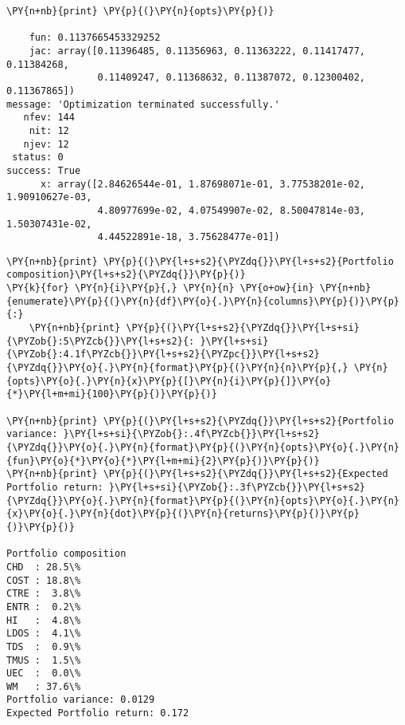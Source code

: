 \begin{Answer}
\begin{tcolorbox}[size=fbox, boxrule=1pt, colback=cellbackground, colframe=cellborder]
\begin{Verbatim}[commandchars=\\\{\}]
\PY{n+nb}{print} \PY{p}{(}\PY{n}{opts}\PY{p}{)}

    fun: 0.1137665453329252
    jac: array([0.11396485, 0.11356963, 0.11363222, 0.11417477, 0.11384268,
                0.11409247, 0.11368632, 0.11387072, 0.12300402, 0.11367865])
message: 'Optimization terminated successfully.'
   nfev: 144
    nit: 12
   njev: 12
 status: 0
success: True
      x: array([2.84626544e-01, 1.87698071e-01, 3.77538201e-02, 1.90910627e-03,
                4.80977699e-02, 4.07549907e-02, 8.50047814e-03, 1.50307431e-02,
                4.44522891e-18, 3.75628477e-01])
\end{Verbatim}
\end{tcolorbox}

\begin{tcolorbox}[size=fbox, boxrule=1pt, colback=cellbackground, colframe=cellborder]
\begin{Verbatim}[commandchars=\\\{\}]
\PY{n+nb}{print} \PY{p}{(}\PY{l+s+s2}{\PYZdq{}}\PY{l+s+s2}{Portfolio composition}\PY{l+s+s2}{\PYZdq{}}\PY{p}{)}
\PY{k}{for} \PY{n}{i}\PY{p}{,} \PY{n}{n} \PY{o+ow}{in} \PY{n+nb}{enumerate}\PY{p}{(}\PY{n}{df}\PY{o}{.}\PY{n}{columns}\PY{p}{)}\PY{p}{:}
    \PY{n+nb}{print} \PY{p}{(}\PY{l+s+s2}{\PYZdq{}}\PY{l+s+si}{\PYZob{}:5\PYZcb{}}\PY{l+s+s2}{: }\PY{l+s+si}{\PYZob{}:4.1f\PYZcb{}}\PY{l+s+s2}{\PYZpc{}}\PY{l+s+s2}{\PYZdq{}}\PY{o}{.}\PY{n}{format}\PY{p}{(}\PY{n}{n}\PY{p}{,} \PY{n}{opts}\PY{o}{.}\PY{n}{x}\PY{p}{[}\PY{n}{i}\PY{p}{]}\PY{o}{*}\PY{l+m+mi}{100}\PY{p}{)}\PY{p}{)}
		
\PY{n+nb}{print} \PY{p}{(}\PY{l+s+s2}{\PYZdq{}}\PY{l+s+s2}{Portfolio variance: }\PY{l+s+si}{\PYZob{}:.4f\PYZcb{}}\PY{l+s+s2}{\PYZdq{}}\PY{o}{.}\PY{n}{format}\PY{p}{(}\PY{n}{opts}\PY{o}{.}\PY{n}{fun}\PY{o}{*}\PY{o}{*}\PY{l+m+mi}{2}\PY{p}{)}\PY{p}{)}
\PY{n+nb}{print} \PY{p}{(}\PY{l+s+s2}{\PYZdq{}}\PY{l+s+s2}{Expected Portfolio return: }\PY{l+s+si}{\PYZob{}:.3f\PYZcb{}}\PY{l+s+s2}{\PYZdq{}}\PY{o}{.}\PY{n}{format}\PY{p}{(}\PY{n}{opts}\PY{o}{.}\PY{n}{x}\PY{o}{.}\PY{n}{dot}\PY{p}{(}\PY{n}{returns}\PY{p}{)}\PY{p}{)}\PY{p}{)}

Portfolio composition
CHD  : 28.5\%
COST : 18.8\%
CTRE :  3.8\%
ENTR :  0.2\%
HI   :  4.8\%
LDOS :  4.1\%
TDS  :  0.9\%
TMUS :  1.5\%
UEC  :  0.0\%
WM   : 37.6\%
Portfolio variance: 0.0129
Expected Portfolio return: 0.172
\end{Verbatim}
\end{tcolorbox}
\end{Answer}

